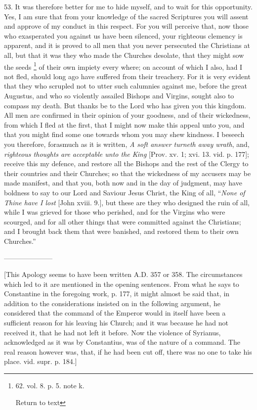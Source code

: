 53. It was therefore better for me to hide myself, and to wait for this
opportunity. Yes, I am sure that from your knowledge of the sacred
Scriptures you will assent and approve of my conduct in this
respect. For you will perceive that, now those who exasperated you
against us have been silenced, your righteous clemency is apparent,
and it is proved to all men that you never persecuted the Christians
at all, but that it was they who made the Churches desolate, that they
might sow the seeds \footnote{62. vol. 8. p. 5. note k.

Return to text}
of their own impiety every where; on account of which I also, had I
not fled, should long ago have suffered from their treachery. For it
is very evident that they who scrupled not to utter such calumnies
against me, before the great Augustus, and who so violently assailed
Bishops and Virgins, sought also to compass my death. But thanks be to
the Lord who has given you this kingdom. All men are confirmed in
their opinion of your goodness, and of their wickedness, from which I
fled at the first, that I might now make this appeal unto you, and
that you might find some one towards whom you may shew kindness. I
beseech you therefore, forasmuch as it is written, \emph{A
soft answer turneth away wrath},
and, \emph{righteous
thoughts are acceptable unto the King} [Prov. xv. 1; xvi. 13. vid. p. 177]; receive
this my defence, and restore all the Bishops and the rest of the
Clergy to their countries and their Churches; so that the wickedness
of my accusers may be made manifest, and that you, both now and in the
day of judgment, may have boldness to say to our Lord and Saviour
Jesus Christ, the King of all, ``\emph{None
of Thine have I lost} [John xviii. 9.], but these are they who designed
the ruin of all, while I was grieved for those who perished, and for
the Virgins who were scourged, and for all other things that were
committed against the Christians; and I brought back them that were
banished, and restored them to their own Churches.''


———————

[This Apology seems to have been written A.D.
357 or 358. The circumstances which led to it are mentioned in the
opening sentences. From what he says to Constantine in the foregoing
work, p. 177, it might almost be said that, in addition to the
considerations insisted on in the following argument, he considered
that the command of the Emperor would in itself have been a sufficient
reason for his leaving his Church; and it was because he had not
received it, that he had not left it before. Now the violence of
Syrianus, acknowledged as it was by Constantius, was of the nature of
a command. The real reason however was, that, if he had been cut off,
there was no one to take his place. vid. supr. p. 184.]

